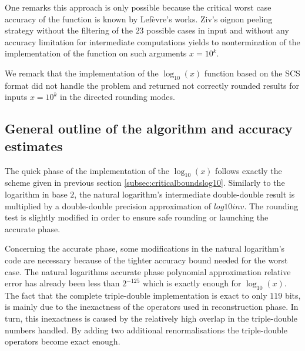 One remarks this approach is only possible because the critical worst
case accuracy of the function is known by Lef{\`e}vre's works. Ziv's oignon peeling
strategy without the filtering of the
$23$ possible cases in input and without any accuracy limitation for
intermediate computations yields to nontermination of the
implementation of the function on such arguments $x = 10^k$.

We remark that the implementation of the $\log_{10}\left(x\right)$
function based on the SCS format did not handle the problem and
returned not correctly rounded results for inputs $x = 10^k$ in the
directed rounding modes.

\subsection{General outline of the algorithm and accuracy estimates}\label{subsec:outlinelog10}
% 
The quick phase of the implementation of the $\log_{10}\left( x
\right)$ follows exactly the scheme given in previous section
\ref{subsec:criticalboundslog10}. Similarly to the logarithm in base
$2$, the natural logarithm's intermediate double-double result is
multiplied by a double-double precision approximation of
$\mathit{log10inv}$. The rounding test is slightly modified in order
to ensure safe rounding or launching the accurate phase.

Concerning the accurate phase, some modifications in the natural
logarithm's code are necessary because of the tighter accuracy bound
needed for the worst case. The natural logarithms accurate phase
polynomial approximation relative error has already been less than
$2^{-125}$ which is exactly enough for $\log_{10}\left( x
\right)$. The fact that the complete triple-double implementation is
exact to only $119$ bits, is mainly due to the inexactness of the
operators used in reconstruction phase. In turn, this inexactness is
caused by the relatively high overlap in the triple-double numbers
handled. By adding two additional renormalisations the triple-double
operators become exact enough.

